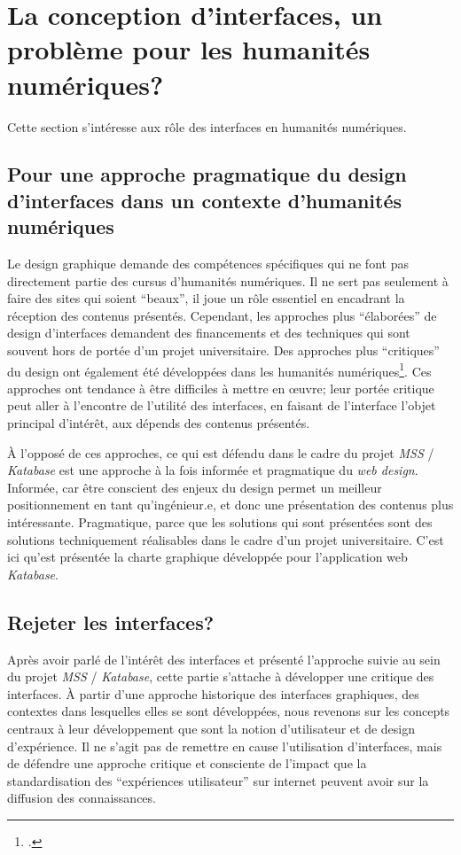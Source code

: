 \documentclass[a4paper, 12pt, twoside]{book}
\newcommand{\ktb}{\textit{Katabase}}
\newcommand{\mss}{\textit{MSS}}
\newcommand{\mssktb}{\mss{} / \ktb{}}
\begin{document}
\section{La conception d'interfaces, un problème pour les humanités numériques?}
Cette section s'intéresse aux rôle des interfaces en humanités numériques.

\subsection{Pour une approche pragmatique du design d'interfaces dans un contexte d'humanités numériques}
Le design graphique demande des compétences spécifiques qui ne font pas directement partie des cursus d'humanités numériques. Il ne sert pas seulement à faire des sites qui soient \enquote{beaux}, il joue un rôle essentiel en encadrant la réception des contenus présentés. Cependant, les approches plus \enquote{élaborées} de design d'interfaces demandent des financements et des techniques qui sont souvent hors de portée d'un projet universitaire. Des approches plus \enquote{critiques} du design ont également été développées dans les humanités numériques\footcite{drucker_visualisation_2020}. Ces approches ont tendance à être difficiles à mettre en œuvre; leur portée critique peut aller à l'encontre de l'utilité des interfaces, en faisant de l'interface l'objet principal d'intérêt, aux dépends des contenus présentés. 

À l'opposé de ces approches, ce qui est défendu dans le cadre du projet \mssktb{} est une approche à la fois informée et pragmatique du \textit{web design}. Informée, car être conscient des enjeux du design permet un meilleur positionnement en tant qu'ingénieur.e, et donc une présentation des contenus plus intéressante. Pragmatique, parce que les solutions qui sont présentées sont des solutions techniquement réalisables dans le cadre d'un projet universitaire. C'est ici qu'est présentée la charte graphique développée pour l'application web \ktb{}.

\subsection{Rejeter les interfaces?}
Après avoir parlé de l'intérêt des interfaces et présenté l'approche suivie au sein du projet \mssktb{}, cette partie s'attache à développer une critique des interfaces. À partir d'une approche historique des interfaces graphiques, des contextes dans lesquelles elles se sont développées, nous revenons sur les concepts centraux à leur développement que sont la notion d'utilisateur et de design d'expérience. Il ne s'agit pas de remettre en cause l'utilisation d'interfaces, mais de défendre une approche critique et consciente de l'impact que la standardisation des \enquote{expériences utilisateur} sur internet peuvent avoir sur la diffusion des connaissances.
\end{document}
